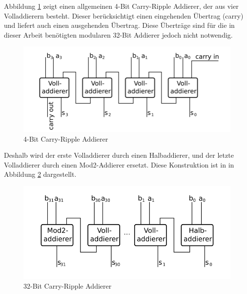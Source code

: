 Abbildung \ref{fig:carryrippleadder4} zeigt einen allgemeinen 4-Bit Carry-Ripple Addierer, der aus vier Volladdierern besteht. Dieser berücksichtigt einen eingehenden
Übertrag (carry) und liefert auch einen ausgehenden Übertrag. Diese Überträge sind für die in dieser Arbeit benötigten modularen 32-Bit Addierer jedoch nicht notwendig.
\begin{figure}[!h]
  \centering
  \includegraphics[scale=0.8]{images/carryrippleadder4}
  \caption[4-Bit Carry-Ripple Addierer]{4-Bit Carry-Ripple Addierer\protect\footnotemark}
  \label{fig:carryrippleadder4}
\end{figure}

Deshalb wird der erste Volladdierer durch einen Halbaddierer, und der letzte Volladdierer durch einen Mod2-Addierer ersetzt.
Diese Konstruktion ist in in Abbildung \ref{fig:carryrippleadder32} dargestellt.
\begin{figure}[!h]
  \centering
  \includegraphics[scale=0.8]{images/carryrippleadder32}
  \caption[32-Bit Carry-Ripple Addierer]{32-Bit Carry-Ripple Addierer\protect\footnotemark}
  \label{fig:carryrippleadder32}
\end{figure}
 \clearpage


